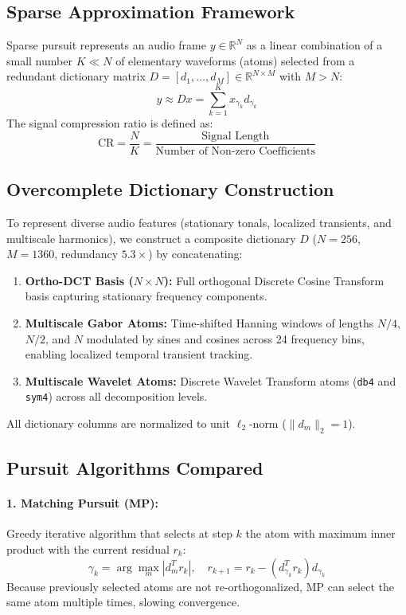 \documentclass{rapportCS}
\begin{document}
\subsection{Sparse Approximation Framework}
Sparse pursuit represents an audio frame $y \in \mathbb{R}^N$ as a linear combination of a small number $K \ll N$ of elementary waveforms (atoms) selected from a redundant dictionary matrix $D = [d_1, \dots, d_M] \in \mathbb{R}^{N \times M}$ with $M > N$:
\begin{equation}
    y \approx D x = \sum_{k=1}^K x_{\gamma_k} d_{\gamma_k}
\end{equation}
The signal compression ratio is defined as:
\begin{equation}
    \text{CR} = \frac{N}{K} = \frac{\text{Signal Length}}{\text{Number of Non-zero Coefficients}}
\end{equation}

\subsection{Overcomplete Dictionary Construction}
To represent diverse audio features (stationary tonals, localized transients, and multiscale harmonics), we construct a composite dictionary $D$ ($N = 256$, $M = 1360$, redundancy $5.3\times$) by concatenating:
\begin{enumerate}
    \item \textbf{Ortho-DCT Basis ($N \times N$):} Full orthogonal Discrete Cosine Transform basis capturing stationary frequency components.
    \item \textbf{Multiscale Gabor Atoms:} Time-shifted Hanning windows of lengths $N/4$, $N/2$, and $N$ modulated by sines and cosines across 24 frequency bins, enabling localized temporal transient tracking.
    \item \textbf{Multiscale Wavelet Atoms:} Discrete Wavelet Transform atoms (\texttt{db4} and \texttt{sym4}) across all decomposition levels.
\end{enumerate}
All dictionary columns are normalized to unit $\ell_2$-norm ($\|d_m\|_2 = 1$).

\subsection{Pursuit Algorithms Compared}

\paragraph{1. Matching Pursuit (MP):}
Greedy iterative algorithm that selects at step $k$ the atom with maximum inner product with the current residual $r_k$:
\begin{equation}
    \gamma_k = \arg\max_m |d_m^T r_k|, \quad r_{k+1} = r_k - (d_{\gamma_k}^T r_k) d_{\gamma_k}
\end{equation}
Because previously selected atoms are not re-orthogonalized, MP can select the same atom multiple times, slowing convergence.
\end{document}
